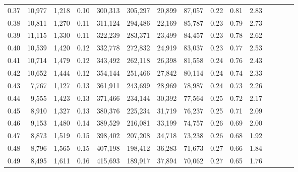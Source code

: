 \begin{tabular}{rrrcrrrrrrrrrrr}
0.37 &  10,977 &  1,218 &                                       0.10 &  300,313 &  305,297 &   20,899 &   87,057 &  0.22 &  0.81 &                         2.83 \\
0.38 &  10,811 &  1,270 &                                       0.11 &  311,124 &  294,486 &   22,169 &   85,787 &  0.23 &  0.79 &                         2.73 \\
0.39 &  11,115 &  1,330 &                                       0.11 &  322,239 &  283,371 &   23,499 &   84,457 &  0.23 &  0.78 &                         2.62 \\
0.40 &  10,539 &  1,420 &                                       0.12 &  332,778 &  272,832 &   24,919 &   83,037 &  0.23 &  0.77 &                         2.53 \\
0.41 &  10,714 &  1,479 &                                       0.12 &  343,492 &  262,118 &   26,398 &   81,558 &  0.24 &  0.76 &                         2.43 \\
0.42 &  10,652 &  1,444 &                                       0.12 &  354,144 &  251,466 &   27,842 &   80,114 &  0.24 &  0.74 &                         2.33 \\
0.43 &   7,767 &  1,127 &                                       0.13 &  361,911 &  243,699 &   28,969 &   78,987 &  0.24 &  0.73 &                         2.26 \\
0.44 &   9,555 &  1,423 &                                       0.13 &  371,466 &  234,144 &   30,392 &   77,564 &  0.25 &  0.72 &                         2.17 \\
0.45 &   8,910 &  1,327 &                                       0.13 &  380,376 &  225,234 &   31,719 &   76,237 &  0.25 &  0.71 &                         2.09 \\
0.46 &   9,153 &  1,480 &                                       0.14 &  389,529 &  216,081 &   33,199 &   74,757 &  0.26 &  0.69 &                         2.00 \\
0.47 &   8,873 &  1,519 &                                       0.15 &  398,402 &  207,208 &   34,718 &   73,238 &  0.26 &  0.68 &                         1.92 \\
0.48 &   8,796 &  1,565 &                                       0.15 &  407,198 &  198,412 &   36,283 &   71,673 &  0.27 &  0.66 &                         1.84 \\
0.49 &   8,495 &  1,611 &                                       0.16 &  415,693 &  189,917 &   37,894 &   70,062 &  0.27 &  0.65 &                         1.76 \\

\end{tabular}
